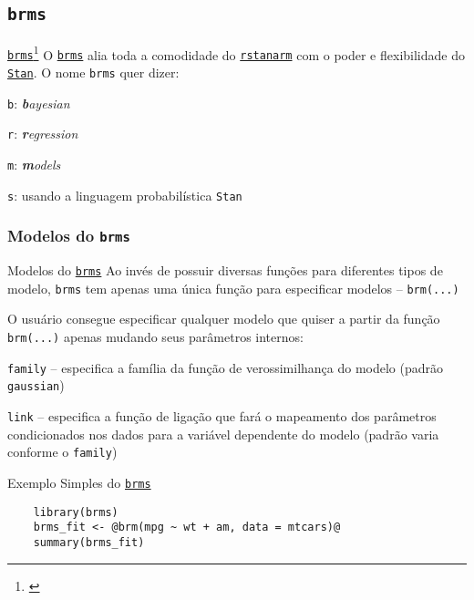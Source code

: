 \subsection{\texttt{brms}}
\begin{frame}{\href{https://paul-buerkner.github.io/brms/}{\texttt{brms}}\footnote{\textcite{brms}}}
	O \href{https://paul-buerkner.github.io/brms/}{\texttt{brms}} alia toda a
	comodidade do \href{http://mc-stan.org/rstanarm/}{\texttt{rstanarm}} com o
	poder e flexibilidade do \href{https://mc-stan.org}{\texttt{Stan}}.
	O nome \texttt{brms} quer dizer:
	\begin{vfilleditems}
		\item \texttt{b}: \textit{\textbf{b}ayesian}
		\item \texttt{r}: \textit{\textbf{r}egression}
		\item \texttt{m}: \textit{\textbf{m}odels}
		\item \texttt{s}: usando a linguagem probabilística \texttt{Stan}
	\end{vfilleditems}
\end{frame}
\subsubsection{Modelos do \texttt{brms}}
\begin{frame}{Modelos do \href{https://paul-buerkner.github.io/brms/}{\texttt{brms}}}
	Ao invés de possuir diversas funções para diferentes tipos de modelo,
	\texttt{brms} tem apenas uma única função para especificar modelos --
	\lstinline!brm(...)!
	\par
	O usuário consegue especificar qualquer modelo que quiser a partir da função
	\lstinline!brm(...)! apenas mudando seus parâmetros internos:
	\begin{vfilleditems}
		\item \lstinline!family! -- especifica a família da função de verossimilhança
		do modelo (padrão \lstinline!gaussian!)
		\item \lstinline!link! -- especifica a função de ligação
		que fará o mapeamento dos parâmetros condicionados nos dados para a variável
		dependente do modelo (padrão varia conforme o \lstinline!family!)
	\end{vfilleditems}
\end{frame}
\begin{frame}[fragile]{Exemplo Simples do \href{https://paul-buerkner.github.io/brms/}{\texttt{brms}}}
	\begin{lstlisting}
    library(brms)
    brms_fit <- @brm(mpg ~ wt + am, data = mtcars)@
    summary(brms_fit)
    \end{lstlisting}
\end{frame}

